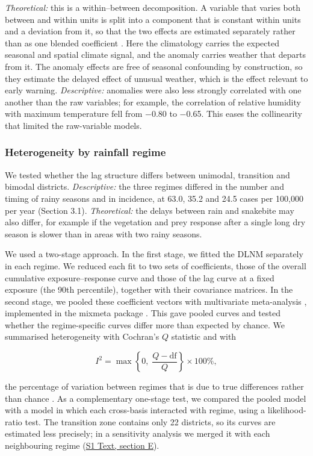 \documentclass[11pt,a4paper]{article}
\begin{document}
\emph{Theoretical:} this is a within--between decomposition. A variable that varies both between and within units is split into a component that is constant within units and a deviation from it, so that the two effects are estimated separately rather than as one blended coefficient \cite{ref42,ref34}. Here the climatology carries the expected seasonal and spatial climate signal, and the anomaly carries weather that departs from it. The anomaly effects are free of seasonal confounding by construction, so they estimate the delayed effect of unusual weather, which is the effect relevant to early warning. \emph{Descriptive:} anomalies were also less strongly correlated with one another than the raw variables; for example, the correlation of relative humidity with maximum temperature fell from −0.80 to −0.65. This eases the collinearity that limited the raw-variable models.

\subsubsection{Heterogeneity by rainfall regime}

We tested whether the lag structure differs between unimodal, transition and bimodal districts. \emph{Descriptive:} the three regimes differed in the number and timing of rainy seasons and in incidence, at 63.0, 35.2 and 24.5 cases per 100,000 per year (Section 3.1). \emph{Theoretical:} the delays between rain and snakebite may also differ, for example if the vegetation and prey response after a single long dry season is slower than in areas with two rainy seasons.

We used a two-stage approach. In the first stage, we fitted the DLNM separately in each regime. We reduced each fit to two sets of coefficients, those of the overall cumulative exposure--response curve and those of the lag curve at a fixed exposure (the 90th percentile), together with their covariance matrices. In the second stage, we pooled these coefficient vectors with multivariate meta-analysis \cite{ref43}, implemented in the mixmeta package \cite{ref44}. This gave pooled curves and tested whether the regime-specific curves differ more than expected by chance. We summarised heterogeneity with Cochran's \(Q\) statistic and with

\[I^2 = \max\left\lbrace 0,\; \frac{Q - \mathrm{df}}{Q}\right\rbrace \times 100\%,\]

the percentage of variation between regimes that is due to true differences rather than chance \cite{ref45}. As a complementary one-stage test, we compared the pooled model with a model in which each cross-basis interacted with regime, using a likelihood-ratio test. The transition zone contains only 22 districts, so its curves are estimated less precisely; in a sensitivity analysis we merged it with each neighbouring regime (\hyperref[s1text-e]{S1 Text, section E}).
\end{document}
